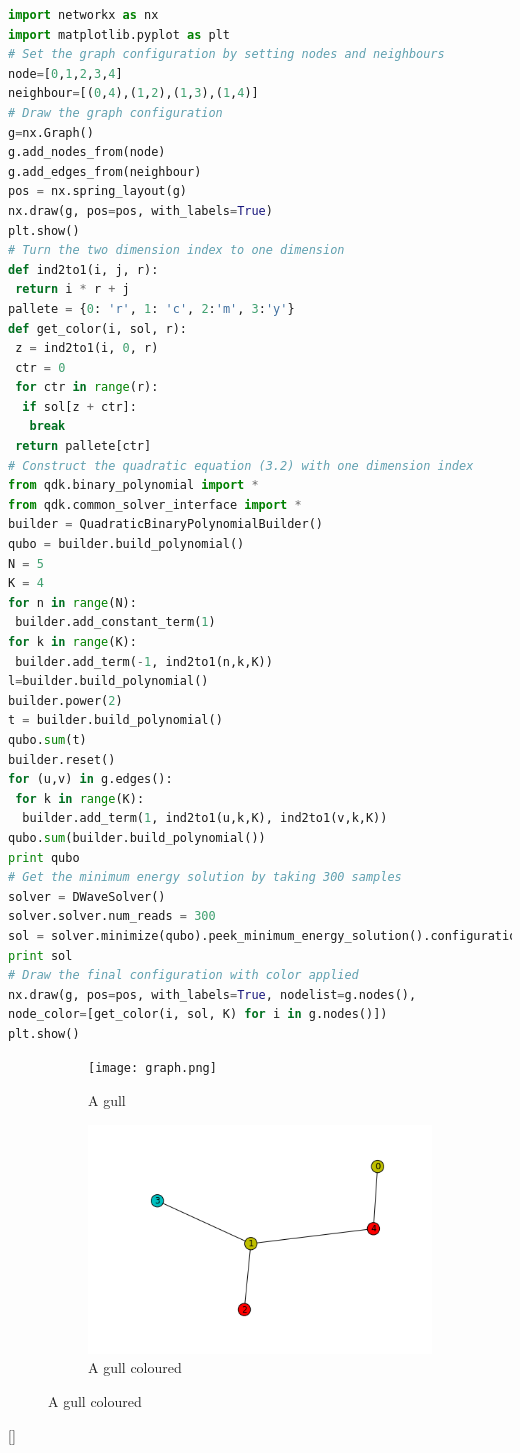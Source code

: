 \begin{lstlisting}[language=python, caption={code adapted from KColoring.ipynb on   \url{ http://qdk.1qbit.com/}   }, label={code}]
import networkx as nx 
import matplotlib.pyplot as plt 
# Set the graph configuration by setting nodes and neighbours 
node=[0,1,2,3,4] 
neighbour=[(0,4),(1,2),(1,3),(1,4)] 
# Draw the graph configuration 
g=nx.Graph() 
g.add_nodes_from(node) 
g.add_edges_from(neighbour) 
pos = nx.spring_layout(g) 
nx.draw(g, pos=pos, with_labels=True) 
plt.show() 
# Turn the two dimension index to one dimension
def ind2to1(i, j, r):  
 return i * r + j  
pallete = {0: 'r', 1: 'c', 2:'m', 3:'y'} 
def get_color(i, sol, r): 
 z = ind2to1(i, 0, r) 
 ctr = 0 
 for ctr in range(r): 
  if sol[z + ctr]: 
   break 
 return pallete[ctr] 
# Construct the quadratic equation (3.2) with one dimension index
from qdk.binary_polynomial import * 
from qdk.common_solver_interface import * 
builder = QuadraticBinaryPolynomialBuilder() 
qubo = builder.build_polynomial() 
N = 5 
K = 4
for n in range(N): 
 builder.add_constant_term(1) 
for k in range(K): 
 builder.add_term(-1, ind2to1(n,k,K)) 
l=builder.build_polynomial() 
builder.power(2) 
t = builder.build_polynomial() 
qubo.sum(t) 
builder.reset() 
for (u,v) in g.edges(): 
 for k in range(K):  
  builder.add_term(1, ind2to1(u,k,K), ind2to1(v,k,K)) 
qubo.sum(builder.build_polynomial()) 
print qubo 
# Get the minimum energy solution by taking 300 samples
solver = DWaveSolver() 
solver.solver.num_reads = 300 
sol = solver.minimize(qubo).peek_minimum_energy_solution().configuration 
print sol 
# Draw the final configuration with color applied
nx.draw(g, pos=pos, with_labels=True, nodelist=g.nodes(),  
node_color=[get_color(i, sol, K) for i in g.nodes()]) 
plt.show() 
\end{lstlisting}
\begin{figure}
    \centering
    \begin{subfigure}[b]{0.4\textwidth}
        \texttt{[image: graph.png]}
        \caption{A gull}
        \label{fig:gull}
    \end{subfigure}
     \begin{subfigure}[b]{0.4\textwidth}
        \includegraphics[width=\textwidth]{figures/colored.png}
        \caption{A gull coloured}
        \label{fig:gull}
    \end{subfigure}
\end{figure}[]



